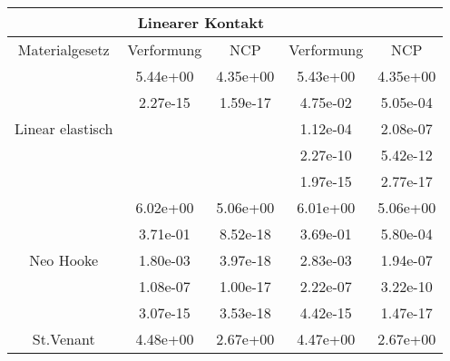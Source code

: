 \begin{table} 
\centering 
\begin{tabular}{c|cc|cc|} 
\cline{2-5} 
 & \multicolumn{2}{|c|}{Linearer Kontakt} &  \\ 
\hline 
\multicolumn{1}{|c|}{Materialgesetz} & \multicolumn{1}{c|}{Verformung} & \multicolumn{1}{c|}{NCP} & \multicolumn{1}{c|}{Verformung} & \multicolumn{1}{c|}{NCP} \\ 
\hline 
\multicolumn{1}{|c|}{\multirow{5}{*}{Linear elastisch}} &\multicolumn{1}{|c|}{  5.44e+00} & \multicolumn{1}{|c|}{  4.35e+00} & \multicolumn{1}{|c|}{  5.43e+00} & \multicolumn{1}{|c|}{  4.35e+00} \\ 
\multicolumn{1}{|c|}{} & \multicolumn{1}{|c|}{  2.27e-15} & \multicolumn{1}{|c|}{  1.59e-17} & \multicolumn{1}{|c|}{  4.75e-02} & \multicolumn{1}{|c|}{  5.05e-04} \\ 
\multicolumn{1}{|c|}{} & \multicolumn{1}{|c|}{} & \multicolumn{1}{|c|}{} & \multicolumn{1}{|c|}{  1.12e-04} & \multicolumn{1}{|c|}{  2.08e-07} \\ 
\multicolumn{1}{|c|}{} & \multicolumn{1}{|c|}{} & \multicolumn{1}{|c|}{} & \multicolumn{1}{|c|}{  2.27e-10} & \multicolumn{1}{|c|}{  5.42e-12} \\ 
\multicolumn{1}{|c|}{} & \multicolumn{1}{|c|}{} & \multicolumn{1}{|c|}{} & \multicolumn{1}{|c|}{  1.97e-15} & \multicolumn{1}{|c|}{  2.77e-17} \\ 
\hline 
\multicolumn{1}{|c|}{\multirow{5}{*}{Neo Hooke}} &\multicolumn{1}{|c|}{  6.02e+00} & \multicolumn{1}{|c|}{  5.06e+00} & \multicolumn{1}{|c|}{  6.01e+00} & \multicolumn{1}{|c|}{  5.06e+00} \\ 
\multicolumn{1}{|c|}{} & \multicolumn{1}{|c|}{  3.71e-01} & \multicolumn{1}{|c|}{  8.52e-18} & \multicolumn{1}{|c|}{  3.69e-01} & \multicolumn{1}{|c|}{  5.80e-04} \\ 
\multicolumn{1}{|c|}{} & \multicolumn{1}{|c|}{  1.80e-03} & \multicolumn{1}{|c|}{  3.97e-18} & \multicolumn{1}{|c|}{  2.83e-03} & \multicolumn{1}{|c|}{  1.94e-07} \\ 
\multicolumn{1}{|c|}{} & \multicolumn{1}{|c|}{  1.08e-07} & \multicolumn{1}{|c|}{  1.00e-17} & \multicolumn{1}{|c|}{  2.22e-07} & \multicolumn{1}{|c|}{  3.22e-10} \\ 
\multicolumn{1}{|c|}{} & \multicolumn{1}{|c|}{  3.07e-15} & \multicolumn{1}{|c|}{  3.53e-18} & \multicolumn{1}{|c|}{  4.42e-15} & \multicolumn{1}{|c|}{  1.47e-17} \\ 
\hline 
\multicolumn{1}{|c|}{\multirow{6}{*}{St.Venant}} &\multicolumn{1}{|c|}{  4.48e+00} & \multicolumn{1}{|c|}{  2.67e+00} & \multicolumn{1}{|c|}{  4.47e+00} & \multicolumn{1}{|c|}{  2.67e+00} \\ 

\end{tabular}
\end{table}
